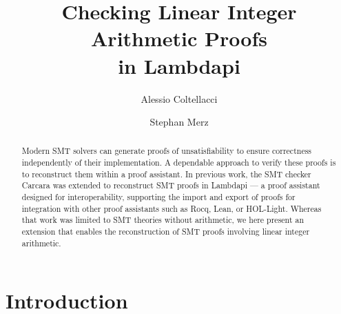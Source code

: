 \documentclass[runningheads]{llncs}
\begin{document}
\title{Checking Linear Integer Arithmetic Proofs\\ in Lambdapi}


\author{Alessio Coltellacci
  \and
  Stephan Merz
}
%
%

%
\maketitle
%
\begin{abstract}
Modern SMT solvers can generate proofs of unsatisfiability to ensure correctness independently of their implementation.
A dependable approach to verify these proofs is to reconstruct them within a proof assistant.
In previous work, the SMT checker Carcara was extended to reconstruct SMT proofs in Lambdapi — a proof assistant designed for interoperability,
supporting the import and export of proofs for integration with other proof assistants such as Rocq, Lean, or HOL-Light.
Whereas that work was limited to SMT theories without arithmetic, we here present an extension that enables the reconstruction of SMT proofs involving linear integer arithmetic.

\end{abstract}

\section{Introduction}
\end{document}
